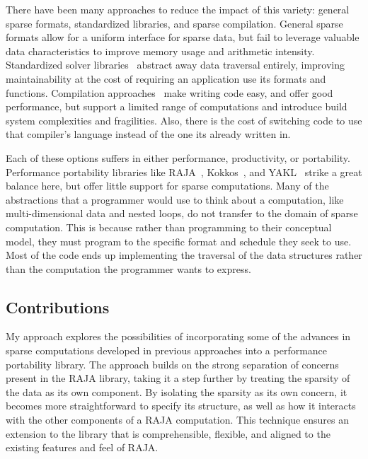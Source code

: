 There have been many approaches to reduce the impact of this variety: general sparse formats, standardized libraries, and sparse compilation.
General sparse formats allow for a uniform interface for sparse data, but fail to leverage valuable data characteristics to improve memory usage and arithmetic intensity.
Standardized solver libraries~\cite{eisenstat1977yale,eisenstat1977yale2,eisenstat1984new,kincaid1982algorithm,chu1980user,george1984new,marsten1981design,saad1990sparskit,falgout2006design} abstract away data traversal entirely, improving maintainability at the cost of requiring an application use its formats and functions.
Compilation approaches~\cite{ahmed2000compiling,ahmed2000framework,bik1993automatic,bik1996automatic,bik2022compiler} make writing code easy, and offer good performance, but support a limited range of computations and introduce build system complexities and fragilities.
Also, there is the cost of switching code to use that compiler's language instead of the one its already written in.

Each of these options suffers in either performance, productivity, or portability.
Performance portability libraries like RAJA~\cite{hornung2014RAJA}, Kokkos~\cite{edwards2014kokkos}, and YAKL~\cite{norman2022portable} strike a great balance here, but offer little support for sparse computations.
Many of the abstractions that a programmer would use to think about a computation, like multi-dimensional data and nested loops, do not transfer to the domain of sparse computation.
This is because rather than programming to their conceptual model, they must program to the specific format and schedule they seek to use.
Most of the code ends up implementing the traversal of the data structures rather than the computation the programmer wants to express.

\subsection{Contributions}

My approach explores the possibilities of incorporating some of the advances in sparse computations developed in previous approaches into a performance portability library.
The approach builds on the strong separation of concerns present in the RAJA library, taking it a step further by treating the sparsity of the data as its own component.
By isolating the sparsity as its own concern, it becomes more straightforward to specify its structure, as well as how it interacts with the other components of a RAJA computation.
This technique ensures an extension to the library that is comprehensible, flexible, and aligned to the existing features and feel of RAJA.

